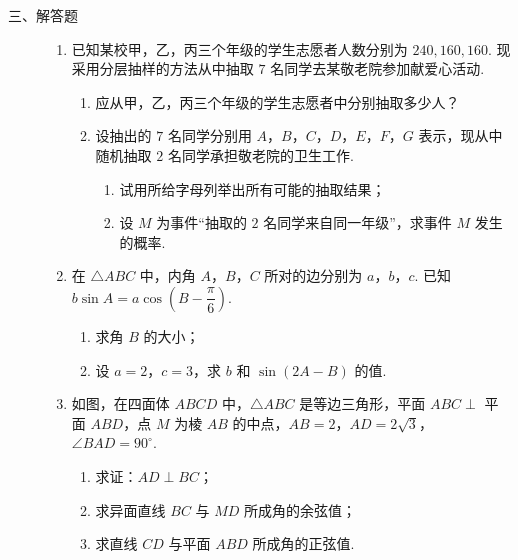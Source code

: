 \begin{description}

    \item[三、解答题]

    \begin{enumerate}[leftmargin=5pt]

      \addtocounter{enumi}{+14}

        \item 已知某校甲，乙，丙三个年级的学生志愿者人数分别为 \(240,160,160\). 现采用分层抽样的方法从中抽取 \(7\) 名同学去某敬老院参加献爱心活动.

\begin{enumerate}
\item 应从甲，乙，丙三个年级的学生志愿者中分别抽取多少人？
\item 设抽出的 \(7\) 名同学分别用 \(A\)，\(B\)，\(C\)，\(D\)，\(E\)，\(F\)，\(G\) 表示，现从中随机抽取 \(2\) 名同学承担敬老院的卫生工作.
\begin{enumerate}
\item 试用所给字母列举出所有可能的抽取结果；
\item 设 \(M\) 为事件“抽取的 \(2\) 名同学来自同一年级”，求事件 \(M\) 发生的概率.
\end{enumerate}
\end{enumerate}

        \item 在 \(\triangle ABC\) 中，内角 \(A\)，\(B\)，\(C\) 所对的边分别为 \(a\)，\(b\)，\(c\). 已知 \(b\sin A=a\cos\!\left(B-\dfrac{\pi}{6}\right)\).

\begin{enumerate}
\item 求角 \(B\) 的大小；
\item 设 \(a=2\)，\(c=3\)，求 \(b\) 和 \(\sin(2A-B)\) 的值.
\end{enumerate}

        \item 如图，在四面体 \(ABCD\) 中，\(\triangle ABC\) 是等边三角形，平面 \(ABC\perp\) 平面 \(ABD\)，点 \(M\) 为棱 \(AB\) 的中点，\(AB=2\)，\(AD=2\sqrt3\)，\(\angle BAD=90^\circ\).

\begin{enumerate}
\item 求证：\(AD\perp BC\)；
\item 求异面直线 \(BC\) 与 \(MD\) 所成角的余弦值；
\item 求直线 \(CD\) 与平面 \(ABD\) 所成角的正弦值.
\end{enumerate}


\end{enumerate}
\end{description}
